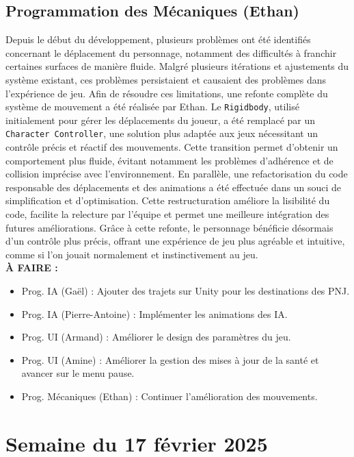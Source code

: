 \documentclass{report}
\begin{document}
\subsection*{Programmation des Mécaniques (Ethan)}
Depuis le début du développement, plusieurs problèmes ont été identifiés concernant le déplacement du personnage, notamment des difficultés à franchir certaines surfaces de manière fluide. Malgré plusieurs itérations et ajustements du système existant, ces problèmes persistaient et causaient des problèmes dans l’expérience de jeu. Afin de résoudre ces limitations, une refonte complète du système de mouvement a été réalisée par Ethan. Le \texttt{Rigidbody}, utilisé initialement pour gérer les déplacements du joueur, a été remplacé par un \texttt{Character Controller}, une solution plus adaptée aux jeux nécessitant un contrôle précis et réactif des mouvements. Cette transition permet d’obtenir un comportement plus fluide, évitant notamment les problèmes d’adhérence et de collision imprécise avec l’environnement. En parallèle, une refactorisation du code responsable des déplacements et des animations a été effectuée dans un souci de simplification et d’optimisation. Cette restructuration améliore la lisibilité du code, facilite la relecture par l'équipe et permet une meilleure intégration des futures améliorations. Grâce à cette refonte, le personnage bénéficie désormais d’un contrôle plus précis, offrant une expérience de jeu plus agréable et intuitive, comme si l'on jouait normalement et instinctivement au jeu.
\\[1cm]
\textbf{À FAIRE :}
\begin{itemize}
    \item Prog. IA (Gaël) : Ajouter des trajets sur Unity pour les destinations des PNJ.
    \item Prog. IA (Pierre-Antoine) : Implémenter les animations des IA.
    \item Prog. UI (Armand) : Améliorer le design des paramètres du jeu.
    \item Prog. UI (Amine) : Améliorer la gestion des mises à jour de la santé et avancer sur le menu pause.
    \item Prog. Mécaniques (Ethan) : Continuer l'amélioration des mouvements.
\end{itemize}







\newpage
\section{Semaine du 17 février 2025}
\end{document}
